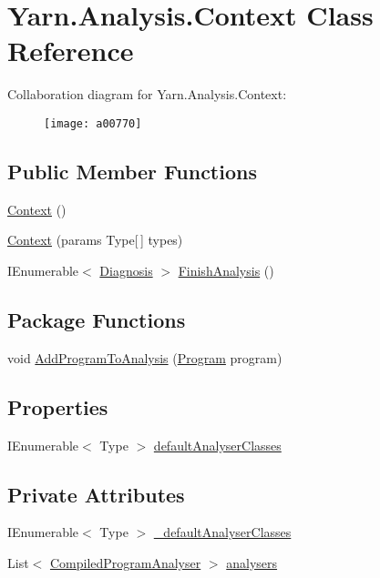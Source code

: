 \hypertarget{a00059}{\section{Yarn.\-Analysis.\-Context Class Reference}
\label{a00059}
}


Collaboration diagram for Yarn.\-Analysis.\-Context\-:
\nopagebreak
\begin{figure}[H]
\begin{center}
\leavevmode
\texttt{[image: a00770]}
\end{center}
\end{figure}
\subsection*{Public Member Functions}
\begin{DoxyCompactItemize}
\item 
\hyperlink{a00059_a8e2c56843e8d374b0f90e23326d8d14a}{Context} ()
\item 
\hyperlink{a00059_ad5f41fb64637c4938bce811153492731}{Context} (params Type\mbox{[}$\,$\mbox{]} types)
\item 
I\-Enumerable$<$ \hyperlink{a00093}{Diagnosis} $>$ \hyperlink{a00059_a1eadea062a5899a64d00ea0172cbbb43}{Finish\-Analysis} ()
\end{DoxyCompactItemize}
\subsection*{Package Functions}
\begin{DoxyCompactItemize}
\item 
void \hyperlink{a00059_a60255a6d54f296d199507acef251244c}{Add\-Program\-To\-Analysis} (\hyperlink{a00154}{Program} program)
\end{DoxyCompactItemize}
\subsection*{Properties}
\begin{DoxyCompactItemize}
\item 
I\-Enumerable$<$ Type $>$ \hyperlink{a00059_afdf24f2512251c2203ba1bde8f4a0f90}{default\-Analyser\-Classes}
\end{DoxyCompactItemize}
\subsection*{Private Attributes}
\begin{DoxyCompactItemize}
\item 
I\-Enumerable$<$ Type $>$ \hyperlink{a00059_ad06829cf848a5936db5724ebced758ec}{\-\_\-default\-Analyser\-Classes}
\item 
List$<$ \hyperlink{a00055}{Compiled\-Program\-Analyser} $>$ \hyperlink{a00059_aa5c7eaa90ad9c47969a3b336080d8991}{analysers}
\end{DoxyCompactItemize}


